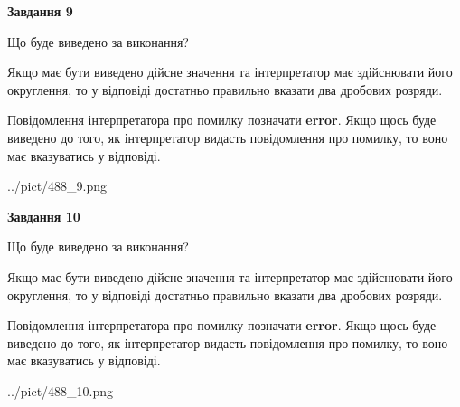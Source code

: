 \documentclass[12pt, ukrainian]{article}
\begin{document}
{\begin {Large}
{\begin {center}\textbf{Завдання 9}\end {center}}\par
Що буде виведено за виконання? \par

Якщо має бути виведено дійсне значення та інтерпретатор має здійснювати його округлення, 
то у відповіді достатньо правильно вказати два дробових розряди.

Повідомлення інтерпретатора про помилку позначати \textbf{error}.
Якщо щось буде виведено до того, як інтерпретатор видасть повідомлення про помилку, 
то воно має вказуватись у відповіді. \par

\begin{center}
	{../pict/488_9.png}
\end{center}
\newpage

{\begin {center}\textbf{Завдання 10}\end {center}}\par
Що буде виведено за виконання? \par

Якщо має бути виведено дійсне значення та інтерпретатор має здійснювати його округлення, 
то у відповіді достатньо правильно вказати два дробових розряди.

Повідомлення інтерпретатора про помилку позначати \textbf{error}.
Якщо щось буде виведено до того, як інтерпретатор видасть повідомлення про помилку, 
то воно має вказуватись у відповіді. \par

\begin{center}
	{../pict/488_10.png}
\end{center}
\newpage

\end {Large}}
\end{document}
